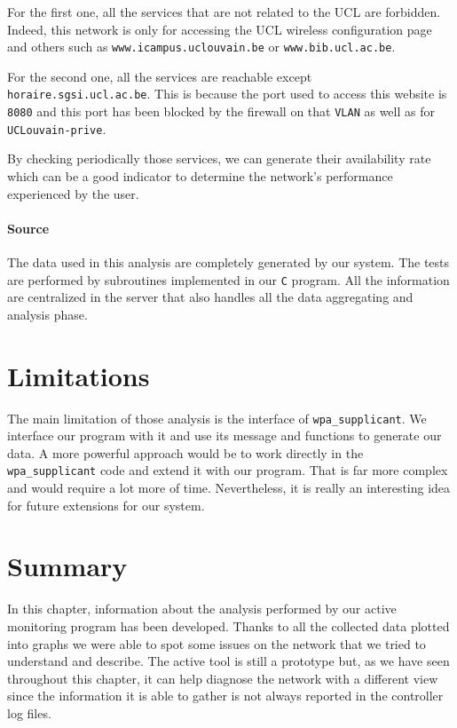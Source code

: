 For the first one, all the services that are not related to the UCL are forbidden. Indeed, this network is only for accessing the UCL wireless configuration page and others such as \texttt{www.icampus.uclouvain.be} or \texttt{www.bib.ucl.ac.be}.

For the second one, all the services are reachable except \texttt{horaire.sgsi.ucl.ac.be}. This is because the port used to access this website is \texttt{8080} and this port has been blocked by the firewall on that \texttt{VLAN} as well as for \texttt{UCLouvain-prive}.

By checking periodically those services, we can generate their availability rate which can be a good indicator to determine the network's performance experienced by the user.


\paragraph*{Source} The data used in this analysis are completely generated by our system. The tests are performed by subroutines implemented in our \texttt{C} program. All the information are centralized in the server that also handles all the data aggregating and analysis phase.

\section{Limitations}


The main limitation of those analysis is the interface of \texttt{wpa\_supplicant}. We interface our program with it and use its message and functions to generate our data. A more powerful approach would be to work directly in the \texttt{wpa\_supplicant} code and extend it with our program. That is far more complex and would require a lot more of time. Nevertheless, it is really an interesting idea for future extensions for our system.

\section{Summary}
In this chapter, information about the analysis performed by our active monitoring program has been developed. Thanks to all the collected data plotted into graphs we were able to spot some issues on the network that we tried to understand and describe. The active tool is still a prototype but, as we have seen throughout this chapter, it can help diagnose the network with a different view since the information it is able to gather is not always reported in the controller log files.
